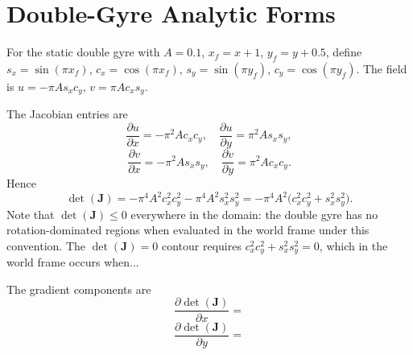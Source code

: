 \documentclass[lettersize,journal]{IEEEtran}
\begin{document}


\appendices

\section{Double-Gyre Analytic Forms}
\label{app:analytic}

For the static double gyre with $A = 0.1$, $x_f = x + 1$,
$y_f = y + 0.5$, define $s_x = \sin(\pi x_f)$, $c_x = \cos(\pi x_f)$,
$s_y = \sin(\pi y_f)$, $c_y = \cos(\pi y_f)$. The field is
$u = -\pi A s_x c_y$, $v = \pi A c_x s_y$.

The Jacobian entries are
\begin{equation}
    \frac{\partial u}{\partial x} = -\pi^2 A c_x c_y, \quad
    \frac{\partial u}{\partial y} =  \pi^2 A s_x s_y,
\end{equation}
\begin{equation}
    \frac{\partial v}{\partial x} = -\pi^2 A s_x s_y, \quad
    \frac{\partial v}{\partial y} =  \pi^2 A c_x c_y.
\end{equation}
Hence
\begin{equation}
    \det(\mathbf{J}) = -\pi^4 A^2 c_x^2 c_y^2 - \pi^4 A^2 s_x^2 s_y^2
                     = -\pi^4 A^2 \bigl(c_x^2 c_y^2 + s_x^2 s_y^2\bigr).
                     \label{eq:det_analytic}
\end{equation}
Note that $\det(\mathbf{J}) \leq 0$ everywhere in the domain: the double gyre
has no rotation-dominated regions when evaluated in the world frame under this
convention. The $\det(\mathbf{J}) = 0$ contour requires
$c_x^2 c_y^2 + s_x^2 s_y^2 = 0$, which in the world frame occurs when...


The gradient components are
\begin{equation}
    \frac{\partial \det(\mathbf{J})}{\partial x} =
    \label{eq:grad_det_analytic_x}
\end{equation}
\begin{equation}
    \frac{\partial \det(\mathbf{J})}{\partial y} =
    \label{eq:grad_det_analytic_y}
\end{equation}
\end{document}
